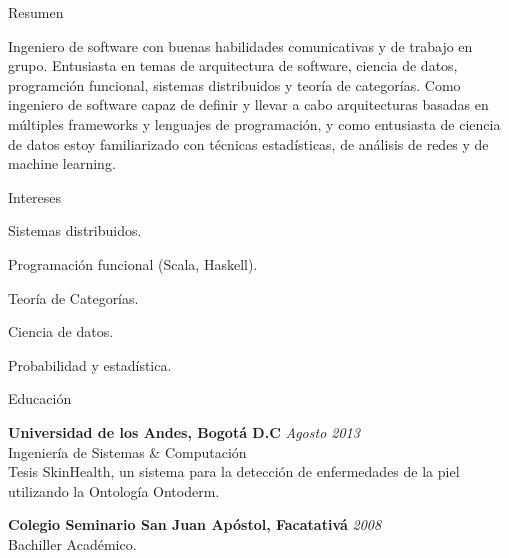 \documentclass[spanish]{resume} %
\begin{document}

\begin{rSection}{Resumen}

Ingeniero de software con buenas habilidades comunicativas y de trabajo en grupo. Entusiasta en temas de arquitectura de software, ciencia de datos, programci\'on funcional, sistemas distribuidos y teor\'ia de categor\'ias. Como ingeniero de software capaz de definir y llevar a cabo arquitecturas basadas en m\'ultiples frameworks y lenguajes de programaci\'on, y como entusiasta de ciencia de datos estoy familiarizado con t\'ecnicas estad\'isticas, de an\'alisis de redes y de machine learning.

\end{rSection}

\begin{rSection}{Intereses}

\item Sistemas distribuidos.
\item Programaci\'on funcional (Scala, Haskell).
\item Teor\'ia de Categor\'ias.
\item Ciencia de datos.
\item Probabilidad y estad\'istica.

\end{rSection}


\begin{rSection}{Educaci\'on}

{\bf Universidad de los Andes, Bogot\'a D.C} \hfill {\em Agosto 2013} \\
Ingenier\'ia de Sistemas \& Computaci\'on \\
Tesis SkinHealth, un sistema para la detecci\'on de enfermedades de la piel utilizando la Ontolog\'ia Ontoderm.

{\bf Colegio Seminario San Juan Ap\'ostol, Facatativ\'a} \hfill {\em 2008} \\
Bachiller Acad\'emico.

\end{rSection}
\end{document}
